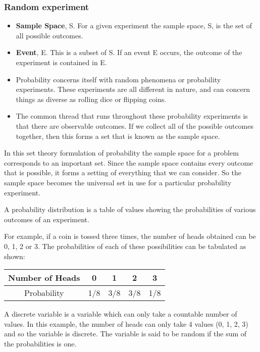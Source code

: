 \documentclass[IntroMain.tex]{subfiles}
\begin{document}
\begin{frame}
	\frametitle{Random experiment}
	\begin{itemize}
		\item \textbf{Sample Space}, S. For a given experiment the sample space, S, is the set of all
		possible outcomes.
		\item \textbf{Event}, E. This is a subset of S. If an event E occurs, the outcome of the experiment is contained in E.
	\end{itemize}
	
\end{frame}
\begin{frame}
	\begin{itemize}
	\item Probability concerns itself with random phenomena or probability experiments. These experiments are all different in nature, and can concern things as diverse as rolling dice or flipping coins. 
	\item The common thread that runs throughout these probability experiments is that there are observable outcomes. If we collect all of the possible outcomes together, then this forms a set that is known as the sample space.
	
	\end{itemize}
	
	
\end{frame}
\begin{frame}
	In this set theory formulation of probability the sample space for a problem corresponds to an important set. Since the sample space contains every outcome that is possible, it forms a setting of everything that we can consider. So the sample space becomes the universal set in use for a particular probability experiment.
	
	A probability distribution is a table of values showing the probabilities of various outcomes of an experiment.
	
	
\end{frame}
\begin{frame}
	For example, if a coin is tossed three times, the number of heads obtained can be 0, 1, 2 or 3. The probabilities of each of these possibilities can be tabulated as shown:
	
	\begin{tabular}{|c|c|c|c|c|}
		\hline Number of Heads & 0 & 1 & 2 & 3 \\ 
		\hline Probability & 1/8  & 3/8  & 3/8 & 1/8 \\ 
		\hline 
	\end{tabular} 
	
	A discrete variable is a variable which can only take a countable number of values. In this example, the number of heads can only take 4 values (0, 1, 2, 3) and so the variable is discrete. The variable is said to be random if the sum of the probabilities is one. 
	
	
\end{frame}
\end{document}
